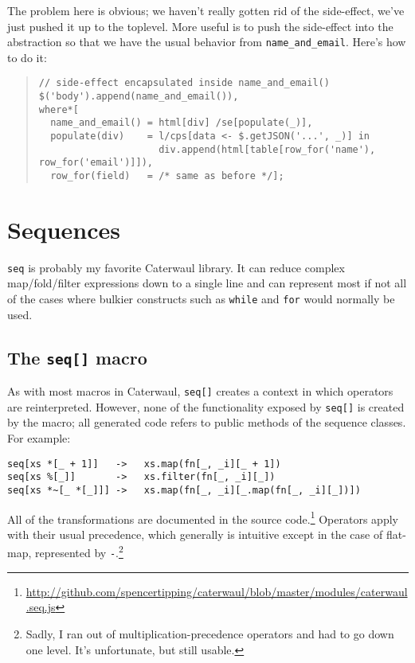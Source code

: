 \documentclass{report}
\begin{document}
    \noindent The problem here is obvious; we haven't really gotten rid of the side-effect, we've just pushed it up to the toplevel. More useful is to push the side-effect into the abstraction
    so that we have the usual behavior from \verb|name_and_email|. Here's how to do it:

\begin{quote}
\begin{verbatim}
// side-effect encapsulated inside name_and_email()
$('body').append(name_and_email()),
where*[
  name_and_email() = html[div] /se[populate(_)],
  populate(div)    = l/cps[data <- $.getJSON('...', _)] in
                     div.append(html[table[row_for('name'), row_for('email')]]),
  row_for(field)   = /* same as before */];
\end{verbatim}
\end{quote}
\chapter{Sequences}
  {\tt seq} is probably my favorite Caterwaul library. It can reduce complex map/fold/filter expressions down to a single line and can represent most if not all of the cases where bulkier
  constructs such as {\tt while} and {\tt for} would normally be used.

\section{The {\tt seq[]} macro}
    As with most macros in Caterwaul, {\tt seq[]} creates a context in which operators are reinterpreted. However, none of the functionality exposed by {\tt seq[]} is created by the macro; all
    generated code refers to public methods of the sequence classes. For example:

\begin{verbatim}
seq[xs *[_ + 1]]   ->   xs.map(fn[_, _i][_ + 1])
seq[xs %[_]]       ->   xs.filter(fn[_, _i][_])
seq[xs *~[_ *[_]]] ->   xs.map(fn[_, _i][_.map(fn[_, _i][_])])
\end{verbatim}

    All of the transformations are documented in the source code.\footnote{\url{http://github.com/spencertipping/caterwaul/blob/master/modules/caterwaul.seq.js}} Operators apply with their
    usual precedence, which generally is intuitive except in the case of flat-map, represented by {\tt -}.\footnote{Sadly, I ran out of multiplication-precedence operators and had to go down
    one level. It's unfortunate, but still usable.}
\end{document}

